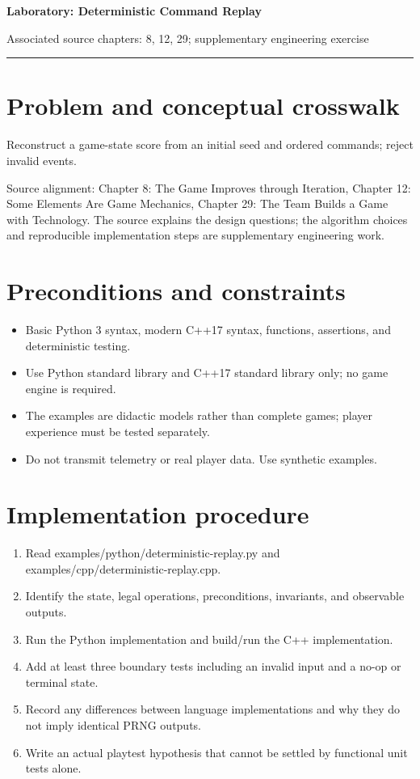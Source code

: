 \documentclass[11pt]{article}
\begin{document}
{\huge\bfseries\color{suiteblue} Laboratory: Deterministic Command Replay}\par
\vspace{0.15in}
{\normalsize\color{suitegray} Associated source chapters: 8, 12, 29; supplementary engineering exercise}\par
\vspace{0.15in}\hrule\vspace{0.15in}

\section{Problem and conceptual crosswalk}
Reconstruct a game-state score from an initial seed and ordered commands; reject invalid events.

Source alignment: Chapter 8: The Game Improves through Iteration, Chapter 12: Some Elements Are Game Mechanics, Chapter 29: The Team Builds a Game with Technology. The source explains the design questions; the algorithm choices and reproducible implementation steps are supplementary engineering work.


\section{Preconditions and constraints}
\begin{itemize}
\item Basic Python 3 syntax, modern C++17 syntax, functions, assertions, and deterministic testing.
\item Use Python standard library and C++17 standard library only; no game engine is required.
\item The examples are didactic models rather than complete games; player experience must be tested separately.
\item Do not transmit telemetry or real player data. Use synthetic examples.
\end{itemize}

\section{Implementation procedure}
\begin{enumerate}
\item Read examples/python/deterministic-replay.py and examples/cpp/deterministic-replay.cpp.
\item Identify the state, legal operations, preconditions, invariants, and observable outputs.
\item Run the Python implementation and build/run the C++ implementation.
\item Add at least three boundary tests including an invalid input and a no-op or terminal state.
\item Record any differences between language implementations and why they do not imply identical PRNG outputs.
\item Write an actual playtest hypothesis that cannot be settled by functional unit tests alone.
\end{enumerate}
\end{document}
